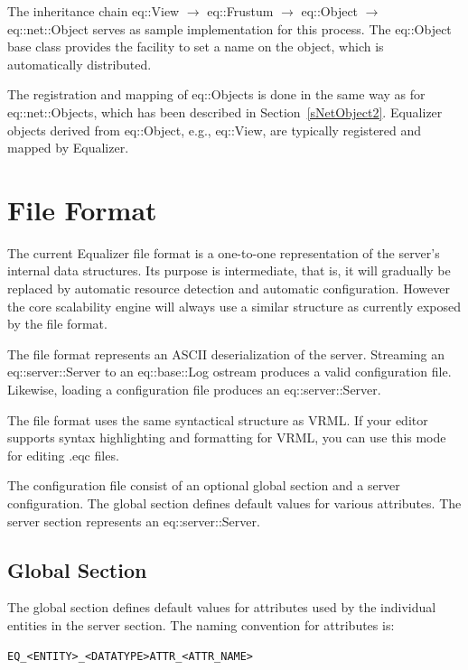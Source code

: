 \documentclass[10pt,a4]{scrartcl}
\newcommand{\sref}[1]{Section~\ref{#1}}
\begin{document}
The inheritance chain \textsf{eq::View} $\rightarrow$
\textsf{eq::Frustum} $\rightarrow$ \textsf{eq::Object} $\rightarrow$
\textsf{eq::net::Object} serves as sample implementation for this
process. The \textsf{eq::Object} base class provides the facility to set
a name on the object, which is automatically distributed.

The registration and mapping of \textsf{eq::Object}s is done in the same
way as for \textsf{eq::net::Object}s, which has been described in
\sref{sNetObject2}. Equalizer objects derived from \textsf{eq::Object},
e.g., \textsf{eq::View}, are typically registered and mapped by
Equalizer.


\newpage
\appendix
\section{\label{aFileFormat}File Format}

The current Equalizer file format is a one-to-one representation of the
server's internal data structures. Its purpose is intermediate, that is,
it will gradually be replaced by automatic resource detection and
automatic configuration. However the core scalability engine will always
use a similar structure as currently exposed by the file format.

The file format represents an ASCII deserialization of the
server. Streaming an \textsf{eq::server::Server} to an \textsf{eq::base::Log}
ostream produces a valid configuration file. Likewise, loading a
configuration file produces an \textsf{eq::server::Server}.

The file format uses the same syntactical structure as VRML. If your
editor supports syntax highlighting and formatting for VRML, you can use
this mode for editing \textsf{.eqc} files.

The configuration file consist of an optional global section and a
server configuration. The global section defines default values for
various attributes. The server section represents an
\textsf{eq::server::Server}.


\subsection{\label{sGlobal}Global Section}

The global section defines default values for attributes used by the
individual entities in the server section. The naming convention for
attributes is:

{\footnotesize\begin{lstlisting}
EQ_<ENTITY>_<DATATYPE>ATTR_<ATTR_NAME>
\end{lstlisting}}
\end{document}

